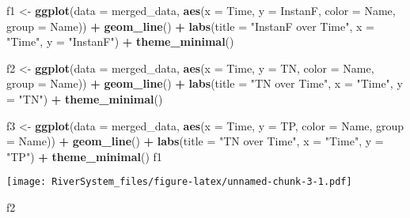 \documentclass[
]{article}
\newenvironment{Shaded}{\begin{snugshade}}{\end{snugshade}}
\newcommand{\AttributeTok}[1]{\textcolor[rgb]{0.13,0.29,0.53}{#1}}
\newcommand{\FunctionTok}[1]{\textcolor[rgb]{0.13,0.29,0.53}{\textbf{#1}}}
\newcommand{\NormalTok}[1]{#1}
\newcommand{\OtherTok}[1]{\textcolor[rgb]{0.56,0.35,0.01}{#1}}
\newcommand{\SpecialCharTok}[1]{\textcolor[rgb]{0.81,0.36,0.00}{\textbf{#1}}}
\newcommand{\StringTok}[1]{\textcolor[rgb]{0.31,0.60,0.02}{#1}}
\begin{document}
\begin{Shaded}
\begin{Highlighting}[]
\NormalTok{f1 }\OtherTok{\textless{}{-}} \FunctionTok{ggplot}\NormalTok{(}\AttributeTok{data =}\NormalTok{ merged\_data, }\FunctionTok{aes}\NormalTok{(}\AttributeTok{x =}\NormalTok{ Time, }\AttributeTok{y =}\NormalTok{ InstanF, }\AttributeTok{color =}\NormalTok{ Name, }\AttributeTok{group =}\NormalTok{ Name)) }\SpecialCharTok{+}
  \FunctionTok{geom\_line}\NormalTok{() }\SpecialCharTok{+}
  \FunctionTok{labs}\NormalTok{(}\AttributeTok{title =} \StringTok{"InstanF over Time"}\NormalTok{, }\AttributeTok{x =} \StringTok{"Time"}\NormalTok{, }\AttributeTok{y =} \StringTok{"InstanF"}\NormalTok{) }\SpecialCharTok{+}
  \FunctionTok{theme\_minimal}\NormalTok{()}

\NormalTok{f2 }\OtherTok{\textless{}{-}} \FunctionTok{ggplot}\NormalTok{(}\AttributeTok{data =}\NormalTok{ merged\_data, }\FunctionTok{aes}\NormalTok{(}\AttributeTok{x =}\NormalTok{ Time, }\AttributeTok{y =}\NormalTok{ TN, }\AttributeTok{color =}\NormalTok{ Name, }\AttributeTok{group =}\NormalTok{ Name)) }\SpecialCharTok{+}
  \FunctionTok{geom\_line}\NormalTok{() }\SpecialCharTok{+}
  \FunctionTok{labs}\NormalTok{(}\AttributeTok{title =} \StringTok{"TN over Time"}\NormalTok{, }\AttributeTok{x =} \StringTok{"Time"}\NormalTok{, }\AttributeTok{y =} \StringTok{"TN"}\NormalTok{) }\SpecialCharTok{+}
  \FunctionTok{theme\_minimal}\NormalTok{()}

\NormalTok{f3 }\OtherTok{\textless{}{-}}  \FunctionTok{ggplot}\NormalTok{(}\AttributeTok{data =}\NormalTok{ merged\_data, }\FunctionTok{aes}\NormalTok{(}\AttributeTok{x =}\NormalTok{ Time, }\AttributeTok{y =}\NormalTok{ TP, }\AttributeTok{color =}\NormalTok{ Name, }\AttributeTok{group =}\NormalTok{ Name)) }\SpecialCharTok{+}
  \FunctionTok{geom\_line}\NormalTok{() }\SpecialCharTok{+}
  \FunctionTok{labs}\NormalTok{(}\AttributeTok{title =} \StringTok{"TN over Time"}\NormalTok{, }\AttributeTok{x =} \StringTok{"Time"}\NormalTok{, }\AttributeTok{y =} \StringTok{"TP"}\NormalTok{) }\SpecialCharTok{+}
  \FunctionTok{theme\_minimal}\NormalTok{()}
\NormalTok{f1}
\end{Highlighting}
\end{Shaded}

\texttt{[image: RiverSystem\_files/figure-latex/unnamed-chunk-3-1.pdf]}

\begin{Shaded}
\begin{Highlighting}[]
\NormalTok{f2}
\end{Highlighting}
\end{Shaded}
\end{document}
